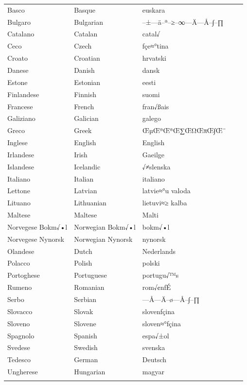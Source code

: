\vspace*{-5mm}
\centering
  \setlength{\tabcolsep}{3.5em}
  \begin{tabularx}{\textwidth}{lllll} \toprule\addlinespace
  Basco & Basque & euskara\\
  Bulgaro & Bulgarian & –±—ä–ª–≥–∞—Ä—Å–∫–∏\\
  Catalano & Catalan & catal√  \\
  Ceco & Czech & ƒçe≈°tina\\
  Croato & Croatian & hrvatski\\
  Danese & Danish & dansk\\
  Estone & Estonian & eesti\\
  Finlandese & Finnish & suomi\\
  Francese & French & fran√ßais\\
  Galiziano & Galician & galego\\
  Greco & Greek & ŒµŒªŒªŒ∑ŒΩŒπŒ∫Œ¨\\
  Inglese & English & English\\
  Irlandese & Irish & Gaeilge\\
  Islandese & Icelandic & √≠slenska\\
  Italiano & Italian & italiano\\
  Lettone & Latvian & latvie≈°u valoda\\
  Lituano & Lithuanian & lietuvi≈≥ kalba\\
  Maltese & Maltese & Malti\\
  Norvegese Bokm√•l & Norwegian Bokm√•l & bokm√•l\\
  Norvegese Nynorsk & Norwegian Nynorsk & nynorsk\\
  Olandese & Dutch & Nederlands\\
  Polacco & Polish & polski\\
  Portoghese & Portuguese & portugu√™s\\
  Rumeno & Romanian & rom√¢nƒÉ\\
  Serbo & Serbian & —Å—Ä–ø—Å–∫–∏\\
  Slovacco & Slovak & slovenƒçina\\
  Sloveno & Slovene & sloven≈°ƒçina\\
  Spagnolo & Spanish & espa√±ol\\
  Svedese & Swedish & svenska\\
  Tedesco & German & Deutsch\\
  Ungherese & Hungarian & magyar\\ \addlinespace \bottomrule
\end{tabularx}
